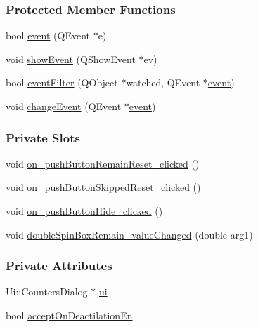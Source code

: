 \subsubsection*{Protected Member Functions}
\begin{DoxyCompactItemize}
\item 
bool \hyperlink{classCountersDialog_a4b3aca52961cf93da2b17a3266b27a12}{event} (Q\+Event $\ast$e)
\item 
void \hyperlink{classCountersDialog_af1e07b5f6ecf796c44a88cf3f58698e4}{show\+Event} (Q\+Show\+Event $\ast$ev)
\item 
bool \hyperlink{classCountersDialog_a93cf3132061916efd64757d22d4298a8}{event\+Filter} (Q\+Object $\ast$watched, Q\+Event $\ast$\hyperlink{classCountersDialog_a4b3aca52961cf93da2b17a3266b27a12}{event})
\item 
void \hyperlink{classCountersDialog_acc7e903ec5ff5b25631c7b1c810a123b}{change\+Event} (Q\+Event $\ast$\hyperlink{classCountersDialog_a4b3aca52961cf93da2b17a3266b27a12}{event})
\end{DoxyCompactItemize}
\subsubsection*{Private Slots}
\begin{DoxyCompactItemize}
\item 
void \hyperlink{classCountersDialog_a8e6ebaa6a437926644028d4fbf255a2d}{on\+\_\+push\+Button\+Remain\+Reset\+\_\+clicked} ()
\item 
void \hyperlink{classCountersDialog_aaa042f36e6a251055f135e67cfe711d6}{on\+\_\+push\+Button\+Skipped\+Reset\+\_\+clicked} ()
\item 
void \hyperlink{classCountersDialog_ac5e601c868667428b7cea2b53bfd674a}{on\+\_\+push\+Button\+Hide\+\_\+clicked} ()
\item 
void \hyperlink{classCountersDialog_ac3004e3c734190e156718361cf848394}{double\+Spin\+Box\+Remain\+\_\+value\+Changed} (double arg1)
\end{DoxyCompactItemize}
\subsubsection*{Private Attributes}
\begin{DoxyCompactItemize}
\item 
Ui\+::\+Counters\+Dialog $\ast$ \hyperlink{classCountersDialog_a6ca843a970b365e531602347eb2e231f}{ui}
\item 
bool \hyperlink{classCountersDialog_ad08acae2aa8655ed9956795b54f3b862}{accept\+On\+Deactilation\+En}
\end{DoxyCompactItemize}


